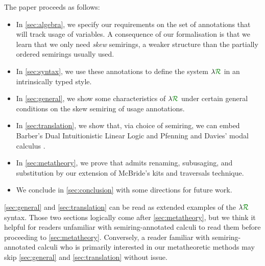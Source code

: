 \documentclass[submission,copyright,creativecommons]{eptcs}
\begin{document}


The paper proceeds as follows:
\begin{itemize}
  \item In \autoref{sec:algebra}, we specify our requirements on the set of
    annotations that will track usage of variables. A consequence of our
    formalisation is that we learn that we only need \emph{skew} semirings, a
    weaker structure than the partially ordered semirings usually used.
  \item In \autoref{sec:syntax}, we use these annotations to define the system
    $\name$ in an intrinsically typed style.
  \item In \autoref{sec:general}, we show some characteristics of $\name$ under
    certain general conditions on the skew semiring of usage annotations.
  \item In \autoref{sec:translation}, we show that, via choice of semiring, we
    can embed Barber's Dual Intuitionistic Linear Logic \cite{Barber1996} and
    Pfenning and Davies' modal calculus \cite{judgmental}.
  \item In \autoref{sec:metatheory}, we prove that \name{} admits renaming,
    subusaging, and substitution by our extension of McBride's kits and
    traversals technique.
  \item We conclude in \autoref{sec:conclusion} with some directions for future
    work.
\end{itemize}

\autoref{sec:general} and \autoref{sec:translation} can be read as extended
examples of the $\name$ syntax.
Those two sections logically come after \autoref{sec:metatheory}, but we think
it helpful for readers unfamiliar with semiring-annotated calculi to read them
before proceeding to \autoref{sec:metatheory}.
Conversely, a reader familiar with semiring-annotated calculi who is primarily
interested in our metatheoretic methods may skip \autoref{sec:general} and
\autoref{sec:translation} without issue.
\end{document}

